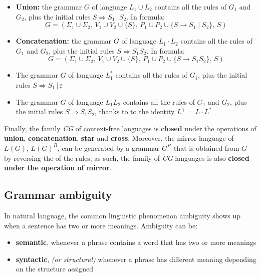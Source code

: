 \documentclass[english]{article}
\begin{document}
\begin{itemize}
  \item \textbf{Union:} the grammar \(G\) of language \(L_1 \cup L_2\) contains all the rules of \(G_1\) and \(G_2\), plus the initial rules \(S \Rightarrow S_1 \,|\, S_2 \). In formula:
        \[ G = \left(\Sigma_1 \cup \Sigma_2, \, V_1 \cup V_2 \cup \{S\}, \, P_1 \cup P_2 \cup \{S \rightarrow S_1 \mid S_2\}, \, S \right) \]
  \item \textbf{Concatenation:} the grammar \(G\) of language \(L_1 \cdot L_2\) contains all the rules of \(G_1\) and \(G_2\), plus the initial rules \(S \Rightarrow S_1 S_2\). In formula:
        \[ G = \left(\Sigma_1 \cup \Sigma_2, \, V_1 \cup V_2 \cup \{S\},  \,P_1 \cup P_2 \cup \{S \rightarrow S_1 S_2\}, \, S \right) \]
  \item The grammar \(G\) of language \(L_1^\ast\) contains all the rules of \(G_1\), plus the initial rules \(S \Rightarrow S_1 \,|\, \varepsilon\)
  \item The grammar \(G\) of language \(L_1  L_2\) contains all the rules of \(G_1\) and \(G_2\), plus the initial rules \(S \Rightarrow S_1 S_2\), thanks to to the identity \(L^+ = L \cdot L^\ast\)
\end{itemize}

Finally, the family \textit{CG} of context-free languages is \textbf{closed} under the operations of \textbf{union}, \textbf{concatenation}, \textbf{star} and \textbf{cross}.
Moreover, the mirror language of \(L(G)\), \(L(G)^R\), can be generated by a grammar \(G^R\) that is obtained from \(G\) by reversing the \RP of the rules; as such, the family of \textit{CG} languages is also \textbf{closed under the operation of mirror}.

\subsection{Grammar ambiguity}
\label{sec:grammar-ambiguity}

In natural language, the common linguistic phenomenon ambiguity shows up when a sentence has two or more meanings.
Ambiguity can be:

\begin{itemize}
  \item \textbf{semantic}, whenever a phrase contains a word that has two or more meanings
  \item \textbf{syntactic}, \textit{(or structural)} whenever a phrase has different meaning depending on the structure assigned
\end{itemize}
\end{document}
